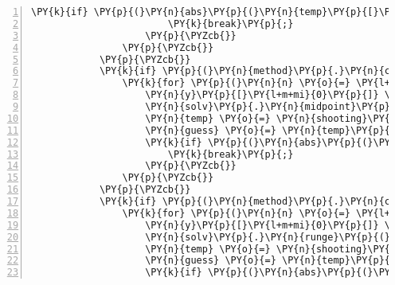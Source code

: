 \begin{Verbatim}[tabsize=2,commandchars=\\\{\},numbers=left,firstnumber=1,stepnumber=1]
					\PY{k}{if} \PY{p}{(}\PY{n}{abs}\PY{p}{(}\PY{n}{temp}\PY{p}{[}\PY{l+m+mi}{1}\PY{p}{]}\PY{p}{)}\PY{o}{\PYZlt{}}\PY{n}{tol}\PY{p}{)}\PY{p}{\PYZob{}} \PY{c+c1}{// finish the loop when sufficently close}
						\PY{k}{break}\PY{p}{;}
					\PY{p}{\PYZcb{}}
				\PY{p}{\PYZcb{}}
			\PY{p}{\PYZcb{}}
			\PY{k}{if} \PY{p}{(}\PY{n}{method}\PY{p}{.}\PY{n}{compare}\PY{p}{(}\PY{l+s}{\PYZdq{}}\PY{l+s}{midpoint}\PY{l+s}{\PYZdq{}}\PY{p}{)} \PY{o}{=}\PY{o}{=} \PY{l+m+mi}{0}\PY{p}{)}\PY{p}{\PYZob{}}
				\PY{k}{for} \PY{p}{(}\PY{n}{n} \PY{o}{=} \PY{l+m+mi}{0}\PY{p}{;} \PY{n}{n} \PY{o}{\PYZlt{}} \PY{l+m+mi}{500}\PY{p}{;} \PY{n}{n}\PY{o}{+}\PY{o}{+}\PY{p}{)}\PY{p}{\PYZob{}}
					\PY{n}{y}\PY{p}{[}\PY{l+m+mi}{0}\PY{p}{]} \PY{o}{=} \PY{l+m+mf}{17.}\PY{p}{;} \PY{n}{y}\PY{p}{[}\PY{l+m+mi}{1}\PY{p}{]} \PY{o}{=} \PY{n}{guess}\PY{p}{;} \PY{n}{y}\PY{p}{[}\PY{l+m+mi}{2}\PY{p}{]} \PY{o}{=} \PY{l+m+mf}{0.}\PY{p}{;} \PY{n}{y}\PY{p}{[}\PY{l+m+mi}{3}\PY{p}{]} \PY{o}{=} \PY{l+m+mf}{1.}\PY{p}{;}
					\PY{n}{solv}\PY{p}{.}\PY{n}{midpoint}\PY{p}{(}\PY{n}{y}\PY{p}{,} \PY{n}{f}\PY{p}{,} \PY{n}{j}\PY{p}{)}\PY{p}{;}
					\PY{n}{temp} \PY{o}{=} \PY{n}{shooting}\PY{p}{(}\PY{n}{guess}\PY{p}{,} \PY{n}{y}\PY{p}{,} \PY{n}{d}\PY{p}{)}\PY{p}{;}
					\PY{n}{guess} \PY{o}{=} \PY{n}{temp}\PY{p}{[}\PY{l+m+mi}{0}\PY{p}{]}\PY{p}{;}
					\PY{k}{if} \PY{p}{(}\PY{n}{abs}\PY{p}{(}\PY{n}{temp}\PY{p}{[}\PY{l+m+mi}{1}\PY{p}{]}\PY{p}{)}\PY{o}{\PYZlt{}}\PY{n}{tol}\PY{p}{)}\PY{p}{\PYZob{}}
						\PY{k}{break}\PY{p}{;}
					\PY{p}{\PYZcb{}}
				\PY{p}{\PYZcb{}}
			\PY{p}{\PYZcb{}}
			\PY{k}{if} \PY{p}{(}\PY{n}{method}\PY{p}{.}\PY{n}{compare}\PY{p}{(}\PY{l+s}{\PYZdq{}}\PY{l+s}{runge\PYZhy{}kutta}\PY{l+s}{\PYZdq{}}\PY{p}{)} \PY{o}{=}\PY{o}{=} \PY{l+m+mi}{0}\PY{p}{)}\PY{p}{\PYZob{}}
				\PY{k}{for} \PY{p}{(}\PY{n}{n} \PY{o}{=} \PY{l+m+mi}{0}\PY{p}{;} \PY{n}{n} \PY{o}{\PYZlt{}} \PY{l+m+mi}{500}\PY{p}{;} \PY{n}{n}\PY{o}{+}\PY{o}{+}\PY{p}{)}\PY{p}{\PYZob{}}
					\PY{n}{y}\PY{p}{[}\PY{l+m+mi}{0}\PY{p}{]} \PY{o}{=} \PY{l+m+mf}{17.}\PY{p}{;} \PY{n}{y}\PY{p}{[}\PY{l+m+mi}{1}\PY{p}{]} \PY{o}{=} \PY{n}{guess}\PY{p}{;} \PY{n}{y}\PY{p}{[}\PY{l+m+mi}{2}\PY{p}{]} \PY{o}{=} \PY{l+m+mf}{0.}\PY{p}{;} \PY{n}{y}\PY{p}{[}\PY{l+m+mi}{3}\PY{p}{]} \PY{o}{=} \PY{l+m+mf}{1.}\PY{p}{;}
					\PY{n}{solv}\PY{p}{.}\PY{n}{runge}\PY{p}{(}\PY{n}{y}\PY{p}{,} \PY{n}{f}\PY{p}{,} \PY{n}{j}\PY{p}{)}\PY{p}{;}
					\PY{n}{temp} \PY{o}{=} \PY{n}{shooting}\PY{p}{(}\PY{n}{guess}\PY{p}{,} \PY{n}{y}\PY{p}{,} \PY{n}{d}\PY{p}{)}\PY{p}{;}
					\PY{n}{guess} \PY{o}{=} \PY{n}{temp}\PY{p}{[}\PY{l+m+mi}{0}\PY{p}{]}\PY{p}{;}
					\PY{k}{if} \PY{p}{(}\PY{n}{abs}\PY{p}{(}\PY{n}{temp}\PY{p}{[}\PY{l+m+mi}{1}\PY{p}{]}\PY{p}{)}\PY{o}{\PYZlt{}}\PY{n}{tol}\PY{p}{)}\PY{p}{\PYZob{}}

\end{Verbatim}
